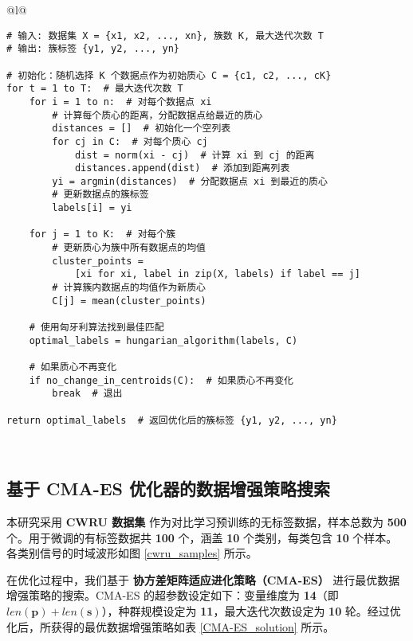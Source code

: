 \documentclass[master]{thesis-uestc}
\begin{document}
\begin{table}[]
    \caption{KMeans算法伪代码}
    \begin{tabular}{@{}l@{}} %
    \toprule
     \\ %
    \midrule
    \begin{lstlisting}[basicstyle=\ttfamily,frame=none]
# 输入: 数据集 X = {x1, x2, ..., xn}, 簇数 K, 最大迭代次数 T
# 输出: 簇标签 {y1, y2, ..., yn}

# 初始化：随机选择 K 个数据点作为初始质心 C = {c1, c2, ..., cK}
for t = 1 to T:  # 最大迭代次数 T
    for i = 1 to n:  # 对每个数据点 xi
        # 计算每个质心的距离，分配数据点给最近的质心
        distances = []  # 初始化一个空列表
        for cj in C:  # 对每个质心 cj
            dist = norm(xi - cj)  # 计算 xi 到 cj 的距离
            distances.append(dist)  # 添加到距离列表
        yi = argmin(distances)  # 分配数据点 xi 到最近的质心
        # 更新数据点的簇标签
        labels[i] = yi
    
    for j = 1 to K:  # 对每个簇
        # 更新质心为簇中所有数据点的均值
        cluster_points = 
            [xi for xi, label in zip(X, labels) if label == j]
        # 计算簇内数据点的均值作为新质心
        C[j] = mean(cluster_points)
    
    # 使用匈牙利算法找到最佳匹配
    optimal_labels = hungarian_algorithm(labels, C)
    
    # 如果质心不再变化
    if no_change_in_centroids(C):  # 如果质心不再变化
        break  # 退出

return optimal_labels  # 返回优化后的簇标签 {y1, y2, ..., yn}
    \end{lstlisting} \\
    \bottomrule
    \end{tabular}
    \label{table:kmeans_code}
\end{table}


\subsection{基于 CMA-ES 优化器的数据增强策略搜索}
\label{sec:CMA-ES_result}

本研究采用 \textbf{CWRU 数据集} 作为对比学习预训练的无标签数据，样本总数为 \textbf{500} 个。用于微调的有标签数据共 \textbf{100} 个，涵盖 \textbf{10} 个类别，每类包含 \textbf{10} 个样本。各类别信号的时域波形如图 \ref{cwru_samples} 所示。

在优化过程中，我们基于 \textbf{协方差矩阵适应进化策略（CMA-ES）} 进行最优数据增强策略的搜索。CMA-ES 的超参数设定如下：变量维度为 \textbf{14}（即 \(len(\mathbf{p}) + len(\mathbf{s})\)），种群规模设定为 \textbf{11}，最大迭代次数设定为 \textbf{10} 轮。经过优化后，所获得的最优数据增强策略如表 \ref{CMA-ES_solution} 所示。
\end{document}
